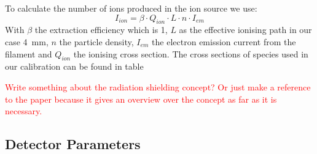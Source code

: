 	

	To calculate the number of ions produced in the ion source we use:
	\begin{equation}
	I_{ion} = \beta\cdot Q_{ion}\cdot L\cdot n\cdot I_{em}
	\end{equation}
	With $\beta$ the extraction efficiency which is 1, %
	$L$ as the effective ionising path in our case 4~\si{\milli\metre}, $n$ the particle density, $I_{em}$ the electron emission current from the filament and $Q_{ion}$ the ionising cross section. The cross sections of species used in our calibration can be found in table %
	
	\textcolor{red}{Write something about the radiation shielding concept? Or just make a reference to the paper because it gives an overview over the concept as far as it is necessary.}
	
	\subsection{Detector Parameters }\label{sec:DetParam} %
	

